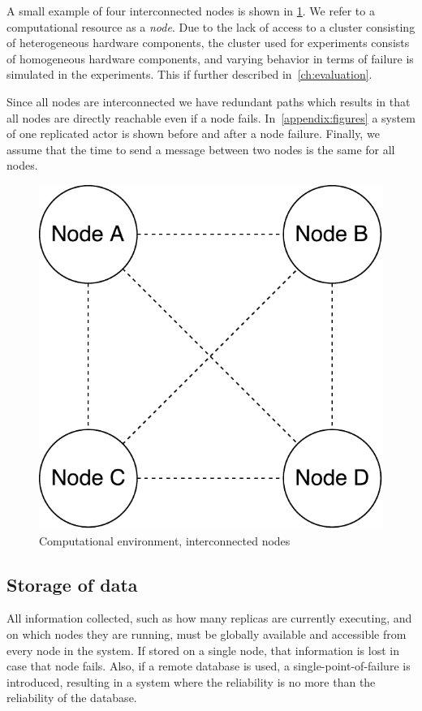 \documentclass{cslthse-msc}
\begin{document}
A small example of four interconnected nodes is shown in \cref{fig:computational_environment}. We refer to a computational resource as a \emph{node}. Due to the lack of access to a cluster consisting of heterogeneous hardware components, the cluster used for experiments consists of homogeneous hardware components, and varying behavior in terms of failure is simulated in the experiments. This if further described in~\cref{ch:evaluation}.

Since all nodes are interconnected we have redundant paths which results in that all nodes are directly reachable even if a node fails. In~\cref{appendix:figures} a system of one replicated actor is shown before and after a node failure. Finally, we assume that the time to send a message between two nodes is the same for all nodes.

\begin{figure}[!hbt]
\centering
\includegraphics[scale=0.5]{images/computational_environment.pdf}
\caption{Computational environment, interconnected nodes} \label{fig:computational_environment}
\end{figure}

\subsection{Storage of data} \label{subsec:design_storage}
All information collected, such as how many replicas are currently executing, and on which nodes they are running, must be globally available and accessible from every node in the system. If stored on a single node, that information is lost in case that node fails. Also, if a remote database is used, a single-point-of-failure is introduced, resulting in a system where the reliability is no more than the reliability of the database. 
\end{document}

